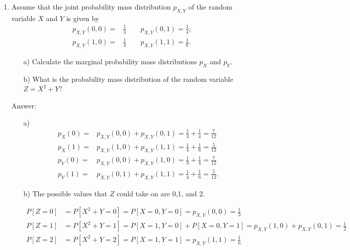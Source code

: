 \documentclass{article}
\begin{document}
\begin{enumerate}
\begin{itemize}[a)]
\end{itemize}


\newpage
\item 

Assume that the joint probability mass distribution $p_{X,Y}$ of the random variable $X$ and $Y$ is given by
\begin{align*}
p_{X,Y}(0,0) =& \frac{1}{3} \qquad p_{X,Y}(0,1)= \frac{1}{4};\\
p_{X,Y}(1,0) =& \frac{1}{4} \qquad  p_{X,Y}(1,1) = \frac{1}{6}.
\end{align*}

\begin{itemize}
	\item[a)] Calculate the marginal probability mass distributions $p_X$ and $p_Y$.
	\item[b)] What is the probability mass distribution of the random variable $Z = X^2 + Y$?
\end{itemize}

Answer:

\begin{itemize}
		\item[a)]
		\begin{align*}
		p_X(0) = &p_{X,Y}(0,0) + p_{X,Y}(0,1) = \frac{1}{3} + \frac{1}{4} = \frac{7}{12}\\
		p_X(1) = &p_{X,Y}(1,0) + p_{X,Y}(1,1) = \frac{1}{4} + \frac{1}{6} = \frac{5}{12}\\
		p_Y(0) = &p_{X,Y}(0,0) + p_{X,Y}(1,0) = \frac{1}{3} + \frac{1}{4} = \frac{7}{12}\\
		p_Y(1) = &p_{X,Y}(0,1) + p_{X,Y}(1,1) = \frac{1}{4} + \frac{1}{6} = \frac{5}{12}.
		\end{align*}
		
		\item[b)] The possible values that $Z$ could take on are 0,1, and 2.
		
		\begin{align*}
		P[Z = 0] &= P[X^2 + Y = 0] = P[X = 0, Y = 0] = p_{X,Y}(0,0) = \frac{1}{3} \\
		P[Z = 1] &= P[X^2 + Y = 1] = P[X = 1, Y = 0] + P[X = 0, Y = 1] = p_{X,Y}(1,0) + p_{X,Y}(0,1) = \frac{1}{2} \\
		P[Z = 2] &= P[X^2 + Y = 2] = P[X = 1, Y = 1] = p_{X,Y}(1,1) = \frac{1}{6} \\
		\end{align*}
		

\end{itemize}
\end{enumerate}
\end{document}
